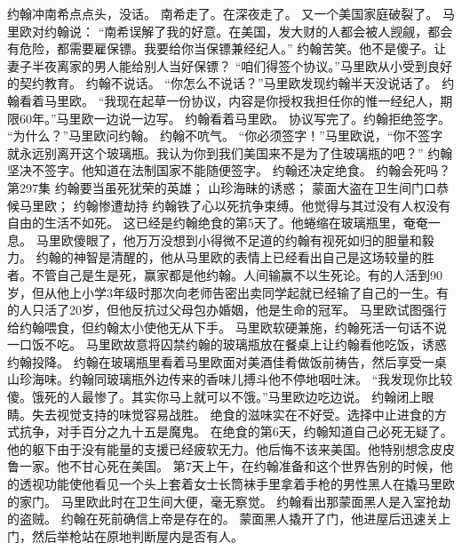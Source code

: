\documentclass[a4paper,12pt,UTF8,twoside]{ctexbook}
\begin{document}
        约翰冲南希点点头，没话。        
        南希走了。在深夜走了。  
        又一个美国家庭破裂了。  
        马里欧对约翰说：  
        “南希误解了我的好意。在美国，发大财的人都会被人觊觎，都会有危险，都需要雇保镖。我要给你当保镖兼经纪人。”  
        约翰苦笑。他不是傻子。让妻子半夜离家的男人能给别人当好保镖？  
        “咱们得签个协议。”马里欧从小受到良好的契约教育。  
        约翰不说话。  
        “你怎么不说话？”马里欧发现约翰半天没说话了。  
        约翰看着马里欧。  
        “我现在起草一份协议，内容是你授权我担任你的惟一经纪人，期限60年。”马里欧一边说一边写。  
        约翰看着马里欧。  
        协议写完了。约翰拒绝签字。  
        “为什么？”马里欧问约翰。  
        约翰不吭气。  
        “你必须签字！”马里欧说，“你不签字就永远别离开这个玻璃瓶。我认为你到我们美国来不是为了住玻璃瓶的吧？”  
        约翰坚决不签字。他知道在法制国家不能随便签字。  
        约翰还决定绝食。  
        约翰会死吗？          第297集  
        约翰要当虽死犹荣的英雄；  
        山珍海昧的诱惑；  
        蒙面大盗在卫生间门口恭候马里欧；  
        约翰惨遭劫持    
        约翰铁了心以死抗争束缚。他觉得与其过没有人权没有自由的生活不如死。  
        这已经是约翰绝食的第5天了。他蜷缩在玻璃瓶里，奄奄一息。  
        马里欧傻眼了，他万万没想到小得微不足道的约翰有视死如归的胆量和毅力。  
        约翰的神智是清醒的，他从马里欧的表情上已经看出自己是这场较量的胜者。不管自己是生是死，赢家都是他约翰。人间输赢不以生死论。有的人活到90岁，但从他上小学3年级时那次向老师告密出卖同学起就已经输了自己的一生。有的人只活了20岁，但他反抗过父母包办婚姻，他是生命的冠军。  
        马里欧试图强行给约翰喂食，但约翰太小使他无从下手。  
        马里欧软硬兼施，约翰死活一句话不说一口饭不吃。  
        马里欧故意将囚禁约翰的玻璃瓶放在餐桌上让约翰看他吃饭，诱惑约翰投降。  
        约翰在玻璃瓶里看着马里欧面对美酒佳肴做饭前祷告，然后享受一桌山珍海味。约翰同玻璃瓶外边传来的香味儿搏斗他不停地咽吐沫。  
        “我发现你比较傻。饿死的人最惨了。其实你马上就可以不饿。”马里欧边吃边说。  
        约翰闭上眼睛。失去视觉支持的味觉容易战胜。  
        绝食的滋味实在不好受。选择中止进食的方式抗争，对手百分之九十五是魔鬼。  
        在绝食的第6天，约翰知道自己必死无疑了。他的躯下由于没有能量的支援已经疲软无力。他后悔不该来美国。他特别想念皮皮鲁一家。他不甘心死在美国。  
        第7天上午，在约翰准备和这个世界告别的时候，他的透视功能使他看见一个头上套着女士长筒袜手里拿着手枪的男性黑人在撬马里欧的家门。  
        马里欧此时在卫生间大便，毫无察觉。  
        约翰看出那蒙面黑人是入室抢劫的盗贼。        
        约翰在死前确信上帝是存在的。  
        蒙面黑人撬开了门，他进屋后迅速关上门，然后举枪站在原地判断屋内是否有人。  
\end{document}
